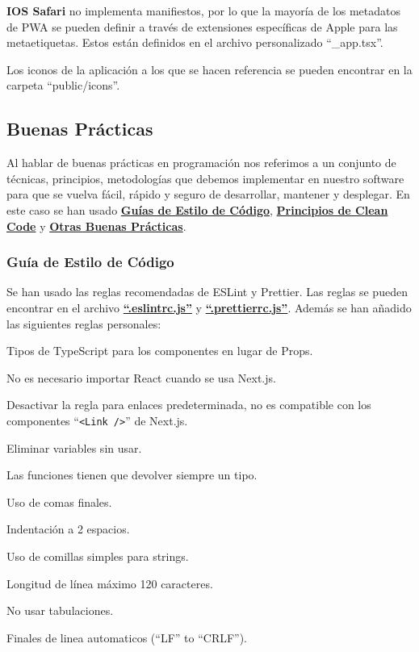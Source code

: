 \documentclass[12pt,twoside,titlepage]{report}
\begin{document}
\textbf{IOS Safari} no implementa manifiestos, por lo que la mayoría de los metadatos de PWA se pueden definir a través de extensiones específicas de Apple para las metaetiquetas. Estos están definidos en el archivo personalizado ``\_app.tsx''.

Los iconos de la aplicación a los que se hacen referencia se pueden encontrar en la carpeta ``public/icons''.


\subsection{Buenas Prácticas}

Al hablar de buenas prácticas en programación nos referimos a un conjunto de técnicas, principios, metodologías que debemos implementar en nuestro software para que se vuelva fácil, rápido y seguro de desarrollar, mantener y desplegar.
En este caso se han usado \hyperref[sec:estiloCodigo]{\textbf{Guías de Estilo de Código}}, \hyperref[sec:cleancode]{\textbf{Principios de Clean Code}} y \hyperref[sec:otrasPracticas]{\textbf{Otras Buenas Prácticas}}.

\subsubsection{Guía de Estilo de Código}
\label{sec:estiloCodigo}

Se han usado las reglas recomendadas de ESLint y Prettier. Las reglas se pueden encontrar en el archivo \href{https://github.com/alberttogoca/EarFit/blob/main/.eslintrc.js}{\textbf{``.eslintrc.js''}} y \href{https://github.com/alberttogoca/EarFit/blob/main/.prettierrc.js}{\textbf{``.prettierrc.js''}}. Además se han añadido las siguientes reglas personales:

\begin{compactitem}
    \item Tipos de TypeScript para los componentes en lugar de Props.
    \item No es necesario importar React cuando se usa Next.js.
    \item Desactivar la regla para enlaces predeterminada, no es compatible con los componentes ``\texttt{<Link />}'' de Next.js.
    \item Eliminar variables sin usar.
    \item Las funciones tienen que devolver siempre un tipo.
    \item Uso de comas finales.
    \item Indentación a 2 espacios.
    \item Uso de comillas simples para strings.
    \item Longitud de línea máximo 120 caracteres.
    \item No usar tabulaciones.
    \item Finales de linea automaticos (``LF'' to ``CRLF'').
\end{compactitem}
\end{document}
